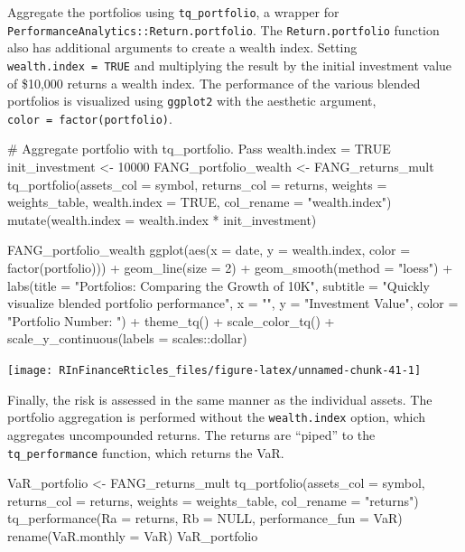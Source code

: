 Aggregate the portfolios using \texttt{tq\_portfolio}, a wrapper for
\texttt{PerformanceAnalytics::Return.portfolio}. The
\texttt{Return.portfolio} function also has additional arguments to
create a wealth index. Setting \texttt{wealth.index\ =\ TRUE} and
multiplying the result by the initial investment value of \$10,000
returns a wealth index. The performance of the various blended
portfolios is visualized using \texttt{ggplot2} with the aesthetic
argument, \texttt{color\ =\ factor(portfolio)}.

\pagebreak

\begin{Schunk}
\begin{Sinput}
# Aggregate portfolio with tq_portfolio. Pass wealth.index = TRUE
init_investment <- 10000
FANG_portfolio_wealth <- FANG_returns_mult %
    tq_portfolio(assets_col = symbol, returns_col = returns,
                 weights = weights_table, wealth.index = TRUE,
                 col_rename = "wealth.index") %
    mutate(wealth.index = wealth.index * init_investment)

FANG_portfolio_wealth  %
    ggplot(aes(x = date, y = wealth.index, color = factor(portfolio))) +
    geom_line(size = 2) +
    geom_smooth(method = "loess") +
    labs(title = "Portfolios: Comparing the Growth of 10K",
         subtitle = "Quickly visualize blended portfolio performance",
         x = "", y = "Investment Value",
         color = "Portfolio Number: ") +
    theme_tq() +
    scale_color_tq() +
    scale_y_continuous(labels = scales::dollar)
\end{Sinput}


\begin{center}\texttt{[image: RInFinanceRticles\_files/figure-latex/unnamed-chunk-41-1]} \end{center}

\end{Schunk}

\hspace{20 mm}

Finally, the risk is assessed in the same manner as the individual
assets. The portfolio aggregation is performed without the
\texttt{wealth.index} option, which aggregates uncompounded returns. The
returns are ``piped'' to the \texttt{tq\_performance} function, which
returns the VaR.

\begin{Schunk}
\begin{Sinput}
VaR_portfolio <- FANG_returns_mult %
    tq_portfolio(assets_col = symbol, returns_col = returns,
                 weights = weights_table, col_rename = "returns") %
    tq_performance(Ra = returns, Rb = NULL, performance_fun = VaR) %
    rename(VaR.monthly = VaR)
VaR_portfolio
\end{Sinput}
\end{Schunk}

